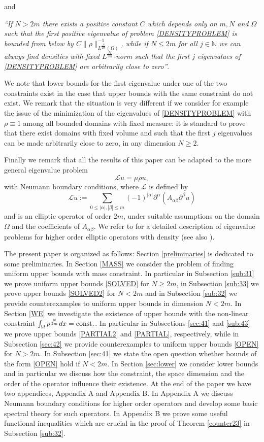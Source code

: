 \documentclass[11pt,a4paper]{amsart}
\numberwithin{equation}{section}
\begin{document}
\noindent and

{\it ``If $N>2m$ there exists a positive constant $C$ which depends only on $m,N$ and $\Omega$ such that the first positive eigenvalue of problem \eqref{DENSITYPROBLEM}  is bounded from below by $C\|\rho\|_{L^{\frac{N}{2m}}(\Omega)}^{-1}$, while if $N\leq 2m$ for all $j\in\mathbb N$ we can always find densities with fixed $L^{\frac{N}{2m}}$-norm such that the first $j$ eigenvalues of \eqref{DENSITYPROBLEM} are arbitrarily close to zero''}.

We note that lower bounds for the first eigenvalue under one of the two constraints exist in the case that upper bounds with the same constraint do not exist. We remark that the situation is very different if we consider for example the issue of the minimization of the eigenvalues of \eqref{DENSITYPROBLEM} with $\rho\equiv 1$ among all bounded domains with fixed measure: it is standard to prove that there exist domains with fixed volume and such that the first $j$ eigenvalues can be made arbitrarily close to zero, in any dimension $N\geq 2$. 

Finally we remark that all the results of this paper can be adapted to the more general eigenvalue problem
$$
\mathcal L u=\mu\rho u,
$$
with Neumann boundary conditions, where $\mathcal L$ is defined by
$$
\mathcal Lu:=\sum_{0\leq |\alpha|,|\beta|\leq m}(-1)^{|\alpha|}\partial^{\alpha}(A_{\alpha\beta}\partial^{\beta}u)
$$
and is an elliptic operator of order $2m$, under suitable assumptions on the domain $\Omega$ and the coefficients of $A_{\alpha\beta}$. We refer to \cite{laproeurasian} for a detailed description of eigenvalue problems for higher order elliptic operators with density (see also \cite[\S\,7]{egorov}).


The present paper is organized as follows: Section \ref{preliminaries} is dedicated to some preliminaries. In Section \ref{MASS} we consider the problem of finding uniform upper bounds with mass constraint. In particular in Subsection \ref{sub:31} we prove uniform upper bounds \eqref{SOLVED} for $N\geq 2m$, in Subsection \ref{sub:33} we prove upper bounds \eqref{SOLVED2} for $N<2m$ and in Subsection \ref{sub:32} we provide counterexamples to uniform upper bounds in dimension $N<2m$. In Section \ref{WE} we investigate the existence of upper bounds with the non-linear constraint $\int_{\Omega}\rho^{\frac{N}{2m}}dx={\rm const.}$. In particular in Subsections \ref{sec:41}  and \ref{sub:43} we prove upper bounds \eqref{PARTIAL2} and \eqref{PARTIAL}, respectively, while in Subsection \ref{sec:42} we provide counterexamples to uniform upper bounds \eqref{OPEN} for $N>2m$. In Subsection \ref{sec:41} we state the open question whether bounds of the form \eqref{OPEN} hold if $N<2m$. In Section \ref{sec:lower} we consider lower bounds and in particular we discuss how the constraint, the space dimension and the order of the operator influence their existence. At the end of the paper we have two appendices, Appendix A and Appendix B. In Appendix A we discuss Neumann boundary conditions for higher order operators and develop some basic spectral theory for such operators. In Appendix B we prove some useful functional inequalities which are crucial in the proof of Theorem \ref{counter23} in Subsection \ref{sub:32}. 
\end{document}
